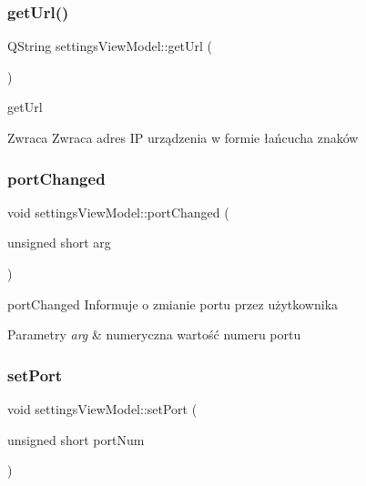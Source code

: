 \subsubsection{\texorpdfstring{get\+Url()}{getUrl()}}
{\footnotesize\ttfamily Q\+String settings\+View\+Model\+::get\+Url (\begin{DoxyParamCaption}{ }\end{DoxyParamCaption})}



get\+Url 

\begin{DoxyReturn}{Zwraca}
Zwraca adres IP urządzenia w formie łańcucha znaków 
\end{DoxyReturn}
\mbox{\label{classsettings_view_model_ab0cf0ae85d3173dea74ed54dae9fef73}} 
\subsubsection{\texorpdfstring{port\+Changed}{portChanged}}
{\footnotesize\ttfamily void settings\+View\+Model\+::port\+Changed (\begin{DoxyParamCaption}\item[{unsigned short}]{arg }\end{DoxyParamCaption})\hspace{0.3cm}{\ttfamily [signal]}}



port\+Changed Informuje o zmianie portu przez użytkownika 


\begin{DoxyParams}{Parametry}
{\em arg} & numeryczna wartość numeru portu \\
\hline
\end{DoxyParams}
\mbox{\label{classsettings_view_model_a893273de2f0be7d15d2c1e17ded4be0c}} 
\subsubsection{\texorpdfstring{set\+Port}{setPort}}
{\footnotesize\ttfamily void settings\+View\+Model\+::set\+Port (\begin{DoxyParamCaption}\item[{unsigned short}]{port\+Num }\end{DoxyParamCaption})\hspace{0.3cm}{\ttfamily [slot]}}




